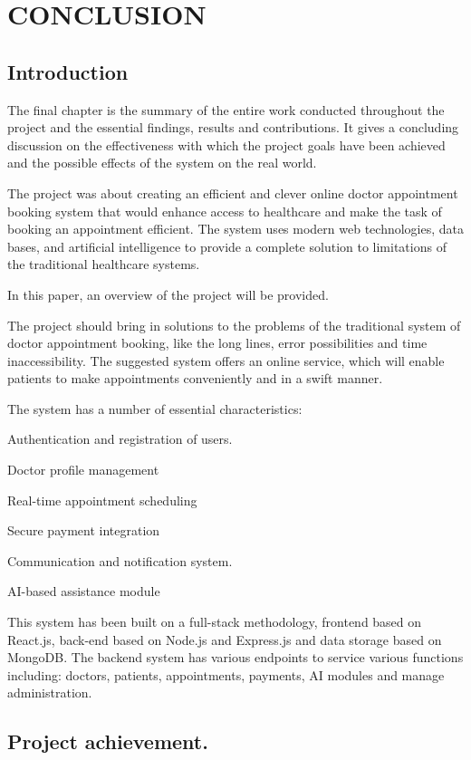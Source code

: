 \chapter{CONCLUSION}

\section{Introduction}

The final chapter is the summary of the entire work conducted throughout the project and the essential findings, results and contributions. It gives a concluding discussion on the effectiveness with which the project goals have been achieved and the possible effects of the system on the real world.

The project was about creating an efficient and clever online doctor appointment booking system that would enhance access to healthcare and make the task of booking an appointment efficient. The system uses modern web technologies, data bases, and artificial intelligence to provide a complete solution to limitations of the traditional healthcare systems.

In this paper, an overview of the project will be provided.

The project should bring in solutions to the problems of the traditional system of doctor appointment booking, like the long lines, error possibilities and time inaccessibility. The suggested system offers an online service, which will enable patients to make appointments conveniently and in a swift manner.

The system has a number of essential characteristics:

Authentication and registration of users.

Doctor profile management

Real-time appointment scheduling

Secure payment integration

Communication and notification system.

AI-based assistance module

This system has been built on a full-stack methodology, frontend based on React.js, back-end based on Node.js and Express.js and data storage based on MongoDB. The backend system has various endpoints to service various functions including: doctors, patients, appointments, payments, AI modules and manage administration.

\section{Project achievement.}

